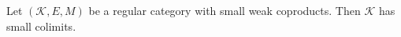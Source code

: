 Let $(\mathcal{K}, E, M)$ be a regular category with small weak coproducts. Then $\mathcal{K}$ has small colimits.
